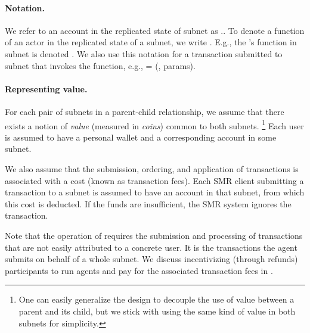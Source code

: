 \paragraph{Notation.} We refer to an account  in the replicated state of subnet  as ..
To denote a function of an actor in the replicated state of a subnet, we write .
E.g., the \gw's function  in subnet  is denoted .
We also use this notation for a transaction  submitted to subnet  that invokes the function, e.g.,  = (, params).

\paragraph{Representing value.}
For each pair of subnets in a parent-child relationship, we assume that there exists a notion of \emph{value} (measured in \emph{coins}) common to both subnets.%
\footnote{One can easily generalize the design to decouple the use of value between a parent and its child, but we stick with using the same kind of value in both subnets for simplicity.}
Each user is assumed to have a personal wallet and a corresponding account in some subnet.

We also assume that the submission, ordering, and application of transactions is associated with a cost (known as transaction fees).
Each SMR client submitting a transaction to a subnet is assumed to have an account in that subnet, from which this cost is deducted.
If the funds are insufficient, the SMR system ignores the transaction.

Note that the operation of \ipc requires the submission and processing of transactions that are not easily attributed to a concrete user.
It is the transactions the \ipc agent submits on behalf of a whole subnet.
We discuss incentivizing (through refunds) participants to run \ipc agents and pay for the associated transaction fees in .
